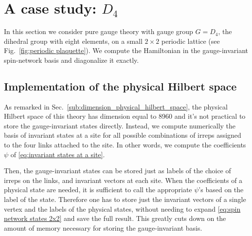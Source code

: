 \section{A case study: \texorpdfstring{$D_4$}{D4}}
\label{sec:a_case_study__d4}

\newcommand{\InvVector}[5]{\psi (
    j_{#1} m_{#1}
    j_{#2} m_{#2}
    j_{#3} n_{#3}
    j_{#4} n_{#4}
    | a_{#5}
)}
\newcommand{\InvVectorPrime}[5]{\psi (
    j_{#1}^\prime m_{#1}^\prime
    j_{#2}^\prime m_{#2}^\prime
    j_{#3}^\prime n_{#3}^\prime
    j_{#4}^\prime n_{#4}^\prime
    | a_{#5}^\prime
)}


In this section we consider pure gauge theory with gauge group $G=D_4$, the dihedral group with eight elements, on a small $2 \times 2 $ periodic lattice (see Fig.~\ref{fig:periodic plaquette}).
We compute the Hamiltonian in the gauge-invariant spin-network basis and diagonalize it exactly.

\subsection{Implementation of the physical Hilbert space}
\label{sub:implementation_of_the_physical_hilbert_space}

As remarked in Sec.~\ref{sub:dimension_physical_hilbert_space}, the physical Hilbert space of this theory has dimension equal to $8960$ and it's not practical to store the gauge-invariant states directly.
Instead, we compute numerically the basis of invariant states at a site for all possible combinations of irreps assigned to the four links attached to the site.
In other words, we compute the coefficients $\psi$ of \eqref{eq:invariant states at a site}.

Then, the gauge-invariant states can be stored just as labels of the choice of \acp{irrep} on the links, and invariant vectors at each site.
When the coefficients of a physical state are needed, it is sufficient to call the appropriate $\psi$'s based on the label of the state.
Therefore one has to store just the invariant vectors of a single vertex and the labels of the physical states, without needing to expand \eqref{eq:spin network states 2x2} and save the full result.
This greatly cuts down on the amount of memory necessary for storing the gauge-invariant basis.


